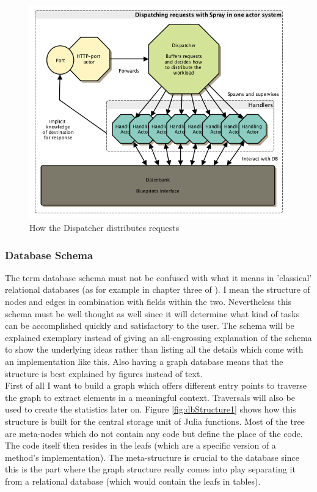 \documentclass[twoside, 11pt]{scrartcl}
\begin{document}
\begin{figure}[h!]		
 	\includegraphics[scale=0.6]{figures/sprayDispatcher.png}
	\caption{How the Dispatcher distributes requests}
	\label{fig:sprayDispatcher}
\end{figure}

\subsubsection{Database Schema}
The term database schema must not be confused with what it means in 'classical' relational databases (as for example in chapter three of \cite{fundamentalsDatabase}). I mean the structure of nodes and edges in combination with fields within the two. Nevertheless this schema must be well thought as well since it will determine what kind of tasks can be accomplished quickly and satisfactory to the user. The schema will be explained exemplary instead of giving an all-engrossing explanation of the schema to show the underlying ideas rather than listing all the details which come with an implementation like this. Also having a graph database means that the structure is best explained by figures instead of text.\\

First of all I want to build a graph which offers different entry points to traverse the graph to extract elements in a meaningful context. Traversals will also be used to create the statistics later on. Figure \ref{fig:dbStructure1} shows how this structure is built for the central storage unit of Julia functions. Most of the tree are meta-nodes which do not contain any code but define the place of the code. The code itself then resides in the leafs (which are a specific version of a method's implementation).  The meta-structure is crucial to the database since this is the part where the graph structure really comes into play separating it from a relational database (which would contain the leafs in tables).
\end{document}
